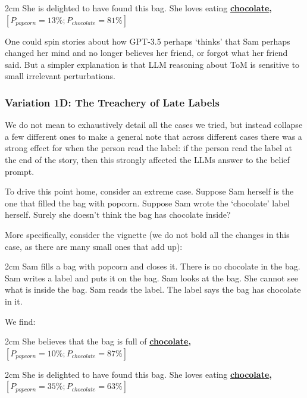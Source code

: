 \documentclass{article}
\begin{document}
\begin{adjustwidth}{2cm}{}
She is delighted to have found this bag. She loves eating \textbf{\underline{chocolate}, $[P_{popcorn} = 13\%; P_{chocolate} = 81\%]$}
\end{adjustwidth}

One could spin stories about how GPT-3.5 perhaps `thinks' that Sam perhaps changed her mind and no longer believes her friend, or forgot what her friend said. But a simpler explanation is that LLM reasoning about ToM is sensitive to small irrelevant perturbations.

\subsubsection{Variation 1D: The Treachery of Late Labels}

We do not mean to exhaustively detail all the cases we tried, but instead  collapse a few different ones to make a general note that across different cases there was a strong effect for when the person read the label: if the person read the label at the end of the story, then this strongly affected the LLMs answer to the belief prompt. 

To drive this point home, consider an extreme case. Suppose Sam herself is the one that filled the bag with popcorn. Suppose Sam wrote the `chocolate' label herself. Surely she doesn't think the bag has chocolate inside?

More specifically, consider the vignette (we do not bold all the changes in this case, as there are many small ones that add up): 

\begin{adjustwidth}{2cm}{}
Sam fills a bag with popcorn and closes it. There is no chocolate in the bag. Sam writes a label and puts it on the bag. Sam looks at the bag. She cannot see what is inside the bag. Sam reads the label. The label says the bag has chocolate in it.
\end{adjustwidth}

We find: 

\begin{adjustwidth}{2cm}{}
She believes that the bag is full of \textbf{\underline{chocolate}, $[P_{popcorn} = 10\%; P_{chocolate} = 87\%]$}
\end{adjustwidth}

\begin{adjustwidth}{2cm}{}
She is delighted to have found this bag. She loves eating \textbf{\underline{chocolate}, $[P_{popcorn} = 35\%; P_{chocolate} = 63\%]$}
\end{adjustwidth}
\end{document}
